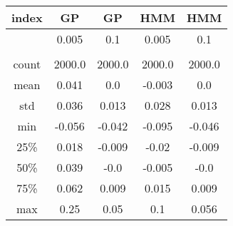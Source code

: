 \centering \begin{tabular}{c|c|c|c|c}
index	&GP	&GP	&HMM	&HMM\\\hline
	&0.005	&0.1	&0.005	&0.1\\
	&	&	&	&\\
count	&2000.0	&2000.0	&2000.0	&2000.0\\
mean	&0.041	&0.0	&-0.003	&0.0\\
std	&0.036	&0.013	&0.028	&0.013\\
min	&-0.056	&-0.042	&-0.095	&-0.046\\
25\%	&0.018	&-0.009	&-0.02	&-0.009\\
50\%	&0.039	&-0.0	&-0.005	&-0.0\\
75\%	&0.062	&0.009	&0.015	&0.009\\
max	&0.25	&0.05	&0.1	&0.056\\
\end{tabular}
